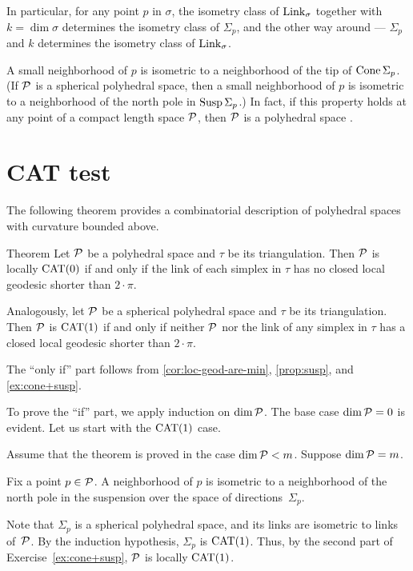 In particular, 
for any point $p$ in $\sigma$,
the isometry class of $\mathop{\rm Link}\nolimits_\sigma$ together with $k=\dim\sigma$
determines the isometry class of $\Sigma_p$, 
 and the other way around --- $\Sigma_p$ and $k$ determines the isometry class of $\mathop{\rm Link}\nolimits_\sigma$.

A small neighborhood of $p$ is isometric to a neighborhood of the tip of $\mathop{\rm Cone}\nolimits\Sigma_p$. 
(If $\mathcal{P}$ is a spherical polyhedral space, then a small neighborhood of $p$ is isometric to a neighborhood of the north pole in $\mathop{\rm Susp}\nolimits\Sigma_p$.)
In fact, if this property holds at any point of a compact length space $\mathcal{P}$,
then  $\mathcal{P}$ is a polyhedral space \cite{lebedeva-petrunin}.

\section{CAT test}

The following theorem provides a combinatorial description of polyhedral spaces with curvature bounded above.


\begin{thm}{Theorem}\label{thm:PL-CAT}
Let $\mathcal{P}$ be a polyhedral space and $\tau$ be its triangulation. 
Then $\mathcal{P}$ is locally $\mathrm{CAT}(0)$ if and only if the link of each simplex in $\tau$ has no closed local geodesic shorter than $2\cdot\pi$.

Analogously, let $\mathcal{P}$ be a spherical polyhedral space and $\tau$ be its triangulation. 
Then $\mathcal{P}$ is $\mathrm{CAT}(1)$ if and only if neither $\mathcal{P}$ nor  the  link of any simplex in $\tau$ has a closed local geodesic shorter than $2\cdot\pi$.
\end{thm}





The ``only if'' part follows from \ref{cor:loc-geod-are-min}, \ref{prop:susp}, and \ref{ex:cone+susp}.

To prove the ``if'' part,
we apply induction on $\operatorname{\rm dim}\nolimits\mathcal{P}$.
The base case $\operatorname{\rm dim}\nolimits\mathcal{P}=0$ is evident.
Let us start with the $\mathrm{CAT}(1)$ case.

Assume that the theorem is proved in the case $\operatorname{\rm dim}\nolimits\mathcal{P}<m$. Suppose  $\operatorname{\rm dim}\nolimits\mathcal{P}=m$.


Fix a point $p\in\mathcal{P}$.
A neighborhood of $p$ 
is isometric to a neighborhood of the north pole in the suspension over the space of directions~$\Sigma_p$.

Note that $\Sigma_p$ is a spherical polyhedral space, 
and its  links are isometric to  links of~$\mathcal{P}$. 
By the  induction hypothesis, $\Sigma_p$ is $\mathrm{CAT}(1)$.
Thus, by the second part of Exercise~\ref{ex:cone+susp}, $\mathcal{P}$ is locally  $\mathrm{CAT}(1)$.


